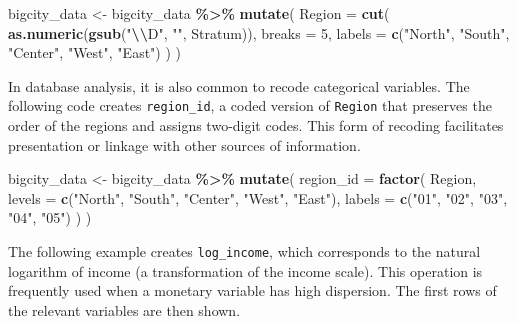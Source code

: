 \documentclass[
  english,
  12pt,
]{book}
\newenvironment{Shaded}{\begin{snugshade}}{\end{snugshade}}
\newcommand{\AttributeTok}[1]{\textcolor[rgb]{0.13,0.29,0.53}{#1}}
\newcommand{\DecValTok}[1]{\textcolor[rgb]{0.00,0.00,0.81}{#1}}
\newcommand{\FunctionTok}[1]{\textcolor[rgb]{0.13,0.29,0.53}{\textbf{#1}}}
\newcommand{\NormalTok}[1]{#1}
\newcommand{\OtherTok}[1]{\textcolor[rgb]{0.56,0.35,0.01}{#1}}
\newcommand{\SpecialCharTok}[1]{\textcolor[rgb]{0.81,0.36,0.00}{\textbf{#1}}}
\newcommand{\StringTok}[1]{\textcolor[rgb]{0.31,0.60,0.02}{#1}}
\begin{document}
\begin{Shaded}
\begin{Highlighting}[]
\NormalTok{bigcity\_data }\OtherTok{\textless{}{-}}\NormalTok{ bigcity\_data }\SpecialCharTok{\%\textgreater{}\%}
  \FunctionTok{mutate}\NormalTok{(}
    \AttributeTok{Region =} \FunctionTok{cut}\NormalTok{(}
      \FunctionTok{as.numeric}\NormalTok{(}\FunctionTok{gsub}\NormalTok{(}\StringTok{"}\SpecialCharTok{\textbackslash{}\textbackslash{}}\StringTok{D"}\NormalTok{, }\StringTok{""}\NormalTok{, Stratum)),}
      \AttributeTok{breaks =} \DecValTok{5}\NormalTok{,}
      \AttributeTok{labels =} \FunctionTok{c}\NormalTok{(}\StringTok{"North"}\NormalTok{, }\StringTok{"South"}\NormalTok{, }\StringTok{"Center"}\NormalTok{, }\StringTok{"West"}\NormalTok{, }\StringTok{"East"}\NormalTok{)}
\NormalTok{    )}
\NormalTok{  )}
\end{Highlighting}
\end{Shaded}

In database analysis, it is also common to recode categorical variables. The following code creates \texttt{region\_id}, a coded version of \texttt{Region} that preserves the order of the regions and assigns two-digit codes. This form of recoding facilitates presentation or linkage with other sources of information.

\begin{Shaded}
\begin{Highlighting}[]
\NormalTok{bigcity\_data }\OtherTok{\textless{}{-}}\NormalTok{ bigcity\_data }\SpecialCharTok{\%\textgreater{}\%}
  \FunctionTok{mutate}\NormalTok{(}
    \AttributeTok{region\_id =} \FunctionTok{factor}\NormalTok{(}
\NormalTok{      Region,}
      \AttributeTok{levels =} \FunctionTok{c}\NormalTok{(}\StringTok{"North"}\NormalTok{, }\StringTok{"South"}\NormalTok{, }\StringTok{"Center"}\NormalTok{, }\StringTok{"West"}\NormalTok{, }\StringTok{"East"}\NormalTok{),}
      \AttributeTok{labels =} \FunctionTok{c}\NormalTok{(}\StringTok{"01"}\NormalTok{, }\StringTok{"02"}\NormalTok{, }\StringTok{"03"}\NormalTok{, }\StringTok{"04"}\NormalTok{, }\StringTok{"05"}\NormalTok{)}
\NormalTok{    )}
\NormalTok{  )}
\end{Highlighting}
\end{Shaded}

The following example creates \texttt{log\_income}, which corresponds to the natural logarithm of income (a transformation of the income scale). This operation is frequently used when a monetary variable has high dispersion. The first rows of the relevant variables are then shown.
\end{document}
